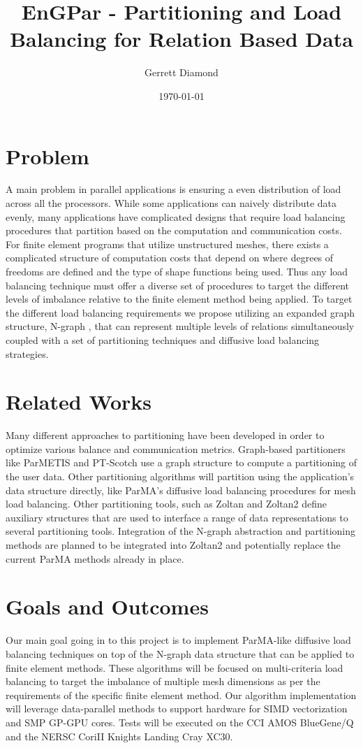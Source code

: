 \documentclass[a4paper]{article}
\title{EnGPar - Partitioning and Load Balancing for Relation Based Data}
\author{Gerrett Diamond}
\date{\today}
\begin{document}
\maketitle

\section{Problem}
A main problem in parallel applications is ensuring a even distribution of load across all the processors. While some applications can naively distribute data evenly, many applications have complicated designs that require load balancing procedures that partition based on the computation and communication costs. For finite element programs that utilize unstructured meshes, there exists a complicated structure of computation costs that depend on where degrees of freedoms are defined and the type of shape functions being used. Thus any load balancing technique must offer a diverse set of procedures to target the different levels of imbalance relative to the finite element method being applied. To target the different load balancing requirements we propose utilizing an expanded graph structure, N-graph \cite{EnGPar2015proposal}, that can represent multiple levels of relations simultaneously coupled with a set of partitioning techniques and diffusive load balancing strategies.

\section{Related Works}
Many different approaches to partitioning have been developed in order to optimize various balance and communication metrics. Graph-based partitioners like ParMETIS \cite{parmetis4} and PT-Scotch \cite{scotch2009} use a graph structure to compute a partitioning of the user data. Other partitioning algorithms will partition using the application's data structure directly, like ParMA's diffusive load balancing procedures \cite{Smith2015} for mesh load balancing. Other partitioning tools, such as Zoltan \cite{devine2002zoltan} and Zoltan2 \cite{zoltan2} define auxiliary structures that are used to interface a range of data representations to several partitioning tools. Integration of the N-graph abstraction and partitioning methods are planned to be integrated into Zoltan2 and potentially replace the current ParMA methods already in place.

\section{Goals and Outcomes}
Our main goal going in to this project is to implement ParMA-like diffusive load balancing techniques on top of the N-graph data structure that can be applied to finite element methods. These algorithms will be focused on multi-criteria load balancing to target the imbalance of multiple mesh dimensions as per the requirements of the specific finite element method. Our algorithm implementation will leverage data-parallel methods to support hardware for SIMD vectorization and SMP GP-GPU cores.  Tests will be executed on the CCI AMOS BlueGene/Q and the NERSC CoriII Knights Landing Cray XC30.



\newpage 

%
\end{document}
